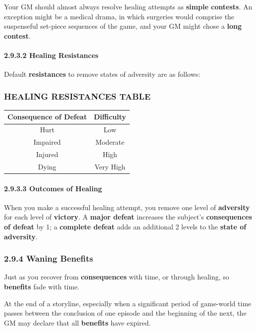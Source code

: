 \documentclass[
]{article}
\begin{document}
Your GM should almost always resolve healing attempts as \textbf{simple
contests}. An exception might be a medical drama, in which surgeries
would comprise the suspenseful set-piece sequences of the game, and your
GM might chose a \textbf{long contest}.

\hypertarget{healing-resistances}{%
\paragraph{2.9.3.2 Healing Resistances}\label{healing-resistances}}

Default \textbf{resistances} to remove states of adversity are as
follows:

\hypertarget{healing-resistances-table}{%
\subsubsection{HEALING RESISTANCES
TABLE}\label{healing-resistances-table}}

\begin{longtable}[]{@{}cc@{}}
\toprule
Consequence of Defeat & Difficulty\tabularnewline
\midrule
\endhead
Hurt & Low\tabularnewline
Impaired & Moderate\tabularnewline
Injured & High\tabularnewline
Dying & Very High\tabularnewline
\bottomrule
\end{longtable}

\hypertarget{outcomes-of-healing}{%
\paragraph{2.9.3.3 Outcomes of Healing}\label{outcomes-of-healing}}

When you make a successful healing attempt, you remove one level of
\textbf{adversity} for each level of \textbf{victory}. A \textbf{major
defeat} increases the subject's \textbf{consequences of defeat} by 1; a
\textbf{complete defeat} adds an additional 2 levels to the
\textbf{state of adversity}.

\hypertarget{waning-benefits}{%
\subsubsection{2.9.4 Waning Benefits}\label{waning-benefits}}

Just as you recover from \textbf{consequences} with time, or through
healing, so \textbf{benefits} fade with time.

At the end of a storyline, especially when a significant period of
game-world time passes between the conclusion of one episode and the
beginning of the next, the GM may declare that all \textbf{benefits}
have expired.
\end{document}
